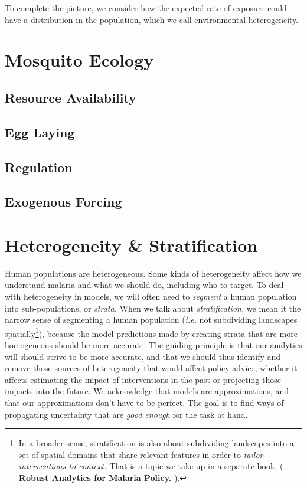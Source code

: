 \documentclass[
]{book}
\begin{document}
To complete the picture, we consider how the expected rate of exposure could have a distribution in the population, which we call environmental heterogeneity.

\section{Mosquito Ecology}\label{mosquito-ecology-2}

\subsection{Resource Availability}\label{resource-availability}

\subsection{Egg Laying}\label{egg-laying-1}

\subsection{Regulation}\label{regulation}

\subsection{Exogenous Forcing}\label{exogenous-forcing}

\section{Heterogeneity \& Stratification}\label{heterogeneity-stratification}

Human populations are heterogeneous. Some kinds of heterogeneity affect how we understand malaria and what we should do, including who to target. To deal with heterogeneity in models, we will often need to \emph{segment} a human population into sub-populations, or \emph{strata.} When we talk about \emph{stratification,} we mean it the narrow sense of segmenting a human population (\emph{i.e.} not subdividing landscapes spatially\footnote{In a broader sense, stratification is also about subdividing landscapes into a set of spatial domains that share relevant features in order to \emph{tailor interventions to context.} That is a topic we take up in a separate book, ( \textbf{Robust Analytics for Malaria Policy.} ).}), because the model predictions made by creating strata that are more homogeneous should be more accurate. The guiding principle is that our analytics will should strive to be more accurate, and that we should thus identify and remove those sources of heterogeneity that would affect policy advice, whether it affects estimating the impact of interventions in the past or projecting those impacts into the future. We acknowledge that models are approximations, and that our approximations don't have to be perfect. The goal is to find ways of propagating uncertainty that are \emph{good enough} for the task at hand.
\end{document}
